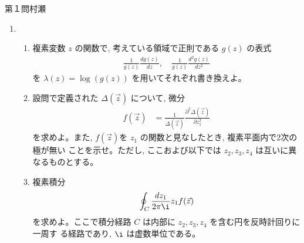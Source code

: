 \begin{question}{第１問}{村瀬}
\begin{enumerate}
\item
  \begin{enumerate}
  \item
    複素変数 $z$ の関数で, 考えている領域で正則である $g(z)$ の表式
    \begin{align*}
      \frac1{g(z)} \frac{dg(z)}{dz},\quad
      \frac1{g(z)} \frac{d^2g(z)}{dz^2}
    \end{align*}
    を $\lambda(z)=\log(g(z))$ を用いてそれぞれ書き換えよ。
  \item
    設問で定義された $\Delta(\vec{z})$ について, 微分
    \begin{align*}
      f(\vec{z}) &= \frac1{\Delta(\vec{z})} \frac{\partial^2 \Delta(\vec{z})}{\partial z_1^2}
    \end{align*}
    を求めよ。また, $f(\vec{z})$を $z_1$ の関数と見なしたとき, 複素平面内で2次の極が無い
    ことを示せ。ただし, ここおよび以下では $z_2, z_3, z_4$ は互いに異なるものとする。
  \item
    複素積分
    \begin{align*}
      \oint_C\frac{dz_1}{2\pi\i} z_1 f(\vec{z})
    \end{align*}
    を求めよ。ここで積分経路 $C$ は内部に $z_2, z_3, z_4$ を含む円を反時計回りに一周す
    る経路であり, $\i$ は虚数単位である。
  \end{enumerate}
\end{enumerate}
\end{question}
